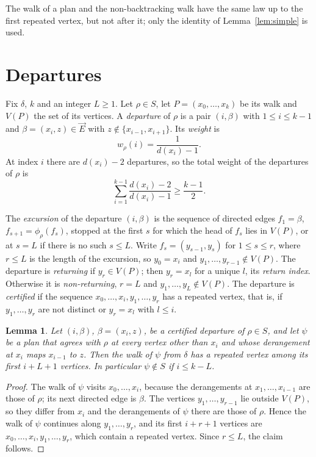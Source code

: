 \documentclass[11pt]{amsart}
\newtheorem{lemma}[theorem]{Lemma}
\theoremstyle{remark}
\newcommand{\vE}{\vec{E}}
\begin{document}
The walk of a plan and the non-backtracking walk have the same law up to the first repeated vertex, but not after it;
only the identity of Lemma~\ref{lem:simple} is used.

\section{Departures}\label{sec:departures}

Fix $\delta$, $k$ and an integer $L\ge1$. Let $\rho\in S$, let $P=(x_0,\dots,x_k)$ be its walk and $V(P)$ the set of
its vertices. A \emph{departure} of $\rho$ is a pair $(i,\beta)$ with $1\le i\le k-1$ and $\beta=(x_i,z)\in\vE$ with
$z\notin\{x_{i-1},x_{i+1}\}$. Its \emph{weight} is
\[
w_\rho(i)=\frac1{d(x_i)-1}.
\]
At index $i$ there are $d(x_i)-2$ departures, so the total weight of the departures of $\rho$ is
\begin{equation}\label{eq:total}
\sum_{i=1}^{k-1}\frac{d(x_i)-2}{d(x_i)-1}\ge\frac{k-1}2.
\end{equation}

The \emph{excursion} of the departure $(i,\beta)$ is the sequence of directed edges $f_1=\beta$,
$f_{s+1}=\phi_\rho(f_s)$, stopped at the first $s$ for which the head of $f_s$ lies in $V(P)$, or at $s=L$ if there is
no such $s\le L$. Write $f_s=(y_{s-1},y_s)$ for $1\le s\le r$, where $r\le L$ is the length of the excursion, so
$y_0=x_i$ and $y_1,\dots,y_{r-1}\notin V(P)$. The departure is \emph{returning} if $y_r\in V(P)$; then $y_r=x_l$ for a
unique $l$, its \emph{return index}. Otherwise it is \emph{non-returning}, $r=L$ and $y_1,\dots,y_L\notin V(P)$. The
departure is \emph{certified} if the sequence $x_0,\dots,x_i,y_1,\dots,y_r$ has a repeated vertex, that is, if
$y_1,\dots,y_r$ are not distinct or $y_r=x_l$ with $l\le i$.

\begin{lemma}\label{lem:certified}
Let $(i,\beta)$, $\beta=(x_i,z)$, be a certified departure of $\rho\in S$, and let $\psi$ be a plan that agrees with
$\rho$ at every vertex other than $x_i$ and whose derangement at $x_i$ maps $x_{i-1}$ to $z$. Then the walk of $\psi$
from $\delta$ has a repeated vertex among its first $i+L+1$ vertices. In particular $\psi\notin S$ if $i\le k-L$.
\end{lemma}

\begin{proof}
The walk of $\psi$ visits $x_0,\dots,x_i$, because the derangements at $x_1,\dots,x_{i-1}$ are those of $\rho$; its next
directed edge is $\beta$. The vertices $y_1,\dots,y_{r-1}$ lie outside $V(P)$, so they differ from $x_i$ and the
derangements of $\psi$ there are those of $\rho$. Hence the walk of $\psi$ continues along $y_1,\dots,y_r$, and its
first $i+r+1$ vertices are $x_0,\dots,x_i,y_1,\dots,y_r$, which contain a repeated vertex. Since $r\le L$, the claim
follows.
\end{proof}
\end{document}
